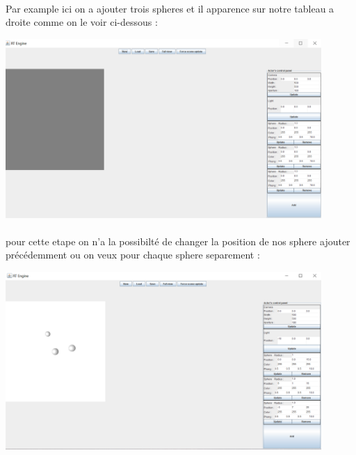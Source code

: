 \documentclass[12pt]{article}
\begin{document}
		\paragraph{}
            Par example ici on a ajouter trois spheres et il apparence sur notre tableau a droite comme on le voir ci-dessous :
		        \begin{center}
	           	\includegraphics[width=0.9\textwidth]{./images/addsphere.png}
		    	\end{center}
			
		\paragraph{}
            pour cette etape on n'a la possibilté de changer la position de nos sphere ajouter précédemment ou on veux pour chaque sphere separement :
		        \begin{center}
	        	\includegraphics[width=0.9\textwidth]{./images/actorposition.png}
		    	\end{center}
		\newpage
\end{document}
